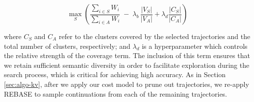 \begin{equation}
    \label{eq:cost_model_v2}
    \max_S( \frac{\sum_{i \in S} W_i}{\sum_{i \in A} W_i} 
   \;-\;
   \lambda_b \,\frac{|V_S|}{|V_A|} + \lambda_d \frac{|C_S|}{|C_A|})
\end{equation}

where $C_S$ and $C_A$ refer to the clusters covered by the selected trajectories and the total number of clusters, respectively; and $\lambda_d$ is a hyperparameter which controls the relative strength of the coverage term.
The inclusion of this term ensures that we retain sufficient semantic diversity in order to facilitate exploration during the search process, which is critical for achieving high accuracy.
As in Section \ref{sec:algo-kv}, after we apply our cost model to prune out trajectories, we re-apply REBASE \cite{wu2024inference} to sample continuations from each of the remaining trajectories. 